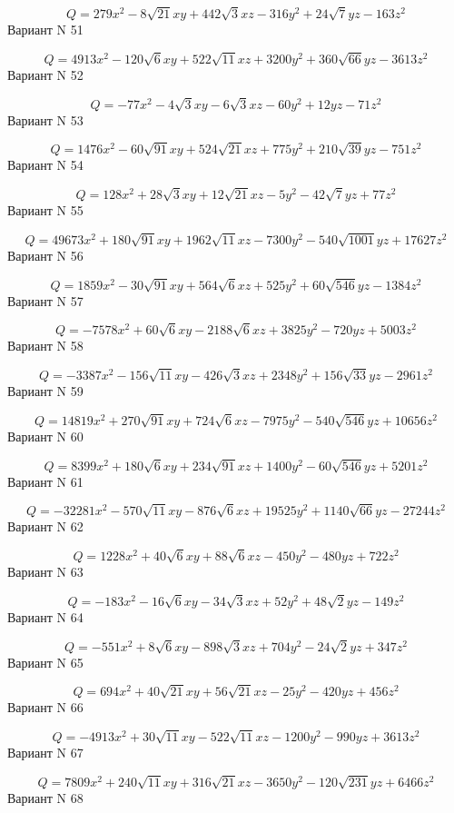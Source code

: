 \documentclass[11pt]{report}
\begin{document}
$$Q = 279 x^{2} - 8 \sqrt{21} x y + 442 \sqrt{3} x z - 316 y^{2} + 24 \sqrt{7} y z - 163 z^{2}$$Вариант N 51

$$Q = 4913 x^{2} - 120 \sqrt{6} x y + 522 \sqrt{11} x z + 3200 y^{2} + 360 \sqrt{66} y z - 3613 z^{2}$$Вариант N 52

$$Q = - 77 x^{2} - 4 \sqrt{3} x y - 6 \sqrt{3} x z - 60 y^{2} + 12 y z - 71 z^{2}$$Вариант N 53

$$Q = 1476 x^{2} - 60 \sqrt{91} x y + 524 \sqrt{21} x z + 775 y^{2} + 210 \sqrt{39} y z - 751 z^{2}$$Вариант N 54

$$Q = 128 x^{2} + 28 \sqrt{3} x y + 12 \sqrt{21} x z - 5 y^{2} - 42 \sqrt{7} y z + 77 z^{2}$$Вариант N 55

$$Q = 49673 x^{2} + 180 \sqrt{91} x y + 1962 \sqrt{11} x z - 7300 y^{2} - 540 \sqrt{1001} y z + 17627 z^{2}$$Вариант N 56

$$Q = 1859 x^{2} - 30 \sqrt{91} x y + 564 \sqrt{6} x z + 525 y^{2} + 60 \sqrt{546} y z - 1384 z^{2}$$Вариант N 57

$$Q = - 7578 x^{2} + 60 \sqrt{6} x y - 2188 \sqrt{6} x z + 3825 y^{2} - 720 y z + 5003 z^{2}$$Вариант N 58

$$Q = - 3387 x^{2} - 156 \sqrt{11} x y - 426 \sqrt{3} x z + 2348 y^{2} + 156 \sqrt{33} y z - 2961 z^{2}$$Вариант N 59

$$Q = 14819 x^{2} + 270 \sqrt{91} x y + 724 \sqrt{6} x z - 7975 y^{2} - 540 \sqrt{546} y z + 10656 z^{2}$$Вариант N 60

$$Q = 8399 x^{2} + 180 \sqrt{6} x y + 234 \sqrt{91} x z + 1400 y^{2} - 60 \sqrt{546} y z + 5201 z^{2}$$Вариант N 61

$$Q = - 32281 x^{2} - 570 \sqrt{11} x y - 876 \sqrt{6} x z + 19525 y^{2} + 1140 \sqrt{66} y z - 27244 z^{2}$$Вариант N 62

$$Q = 1228 x^{2} + 40 \sqrt{6} x y + 88 \sqrt{6} x z - 450 y^{2} - 480 y z + 722 z^{2}$$Вариант N 63

$$Q = - 183 x^{2} - 16 \sqrt{6} x y - 34 \sqrt{3} x z + 52 y^{2} + 48 \sqrt{2} y z - 149 z^{2}$$Вариант N 64

$$Q = - 551 x^{2} + 8 \sqrt{6} x y - 898 \sqrt{3} x z + 704 y^{2} - 24 \sqrt{2} y z + 347 z^{2}$$Вариант N 65

$$Q = 694 x^{2} + 40 \sqrt{21} x y + 56 \sqrt{21} x z - 25 y^{2} - 420 y z + 456 z^{2}$$Вариант N 66

$$Q = - 4913 x^{2} + 30 \sqrt{11} x y - 522 \sqrt{11} x z - 1200 y^{2} - 990 y z + 3613 z^{2}$$Вариант N 67

$$Q = 7809 x^{2} + 240 \sqrt{11} x y + 316 \sqrt{21} x z - 3650 y^{2} - 120 \sqrt{231} y z + 6466 z^{2}$$Вариант N 68
\end{document}
